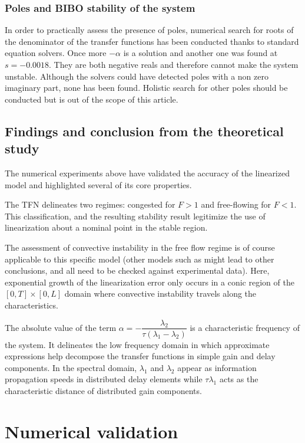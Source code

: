 \documentclass[5p,twocolumn]{elsarticle}
\begin{document}
\subsubsection{Poles and BIBO stability of the system}
In order to practically assess the presence of poles, numerical search for roots of the denominator of the transfer functions has been conducted thanks to standard equation solvers. Once more $-\alpha$ is a solution and another one was found at $s=-0.0018$. They are both negative reals and therefore cannot make the system unstable. Although the solvers could have detected poles with a non zero imaginary part, none has been found. Holistic search for other poles should be conducted but is out of the scope of this article.

\subsection{Findings and conclusion from the theoretical study}
The numerical experiments above have validated the accuracy of the linearized model and highlighted several of its core properties.

The TFN delineates two regimes: congested for $F > 1$ and free-flowing for $F < 1$. This classification, and the resulting stability result legitimize the use of linearization about a nominal point in the stable region.

The assessment of convective instability in the free flow regime is of course applicable to this specific model (other models such as \cite{Jamitons-multi-valued-fund} might lead to other conclusions, and all need to be checked against experimental data). Here, exponential growth of the linearization error only occurs in a conic region of the  $\left[0,T\right] \times \left[0,L\right]$ domain where convective instability travels along the characteristics.

The absolute value of the term $\alpha = -\dfrac{\lambda_2}{\tau(\lambda_1 - \lambda_2)}$ is a characteristic frequency of the system. It delineates the low frequency domain in which approximate expressions help decompose the transfer functions in simple gain and delay components. In the spectral domain, $\lambda_{1}$ and $\lambda_{2}$ appear as information propagation speeds in distributed delay elements while  $\tau\lambda_{1}$ acts as the characteristic distance of distributed gain components.


\section{Numerical validation}
\end{document}
